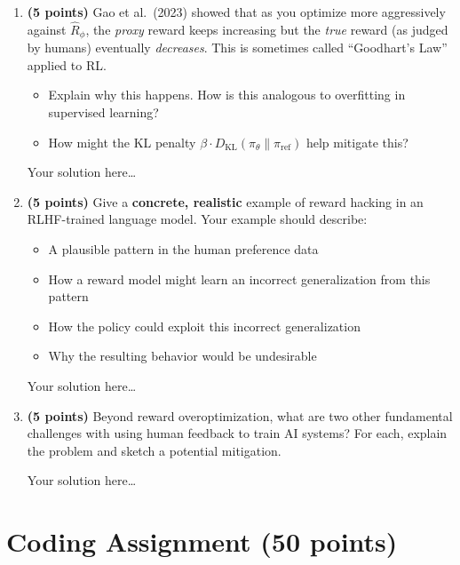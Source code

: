 \documentclass[11pt]{article}
\begin{document}
\begin{enumerate}[label=(\alph*)]
\item \textbf{(5 points)} Gao et al.\ (2023) showed that as you optimize
more aggressively against $\hat{R}_\phi$, the \emph{proxy} reward keeps
increasing but the \emph{true} reward (as judged by humans) eventually
\emph{decreases}.  This is sometimes called ``Goodhart's Law'' applied
to RL.
\begin{itemize}
  \item Explain why this happens.  How is this analogous to overfitting
        in supervised learning?
  \item How might the KL penalty $\beta \cdot D_{\text{KL}}(\pi_\theta \|
        \pi_{\text{ref}})$ help mitigate this?
\end{itemize}

\begin{solution}
Your solution here\ldots
\end{solution}

\item \textbf{(5 points)} Give a \textbf{concrete, realistic} example of
reward hacking in an RLHF-trained language model.  Your example should
describe:
\begin{itemize}
  \item A plausible pattern in the human preference data
  \item How a reward model might learn an incorrect generalization from
        this pattern
  \item How the policy could exploit this incorrect generalization
  \item Why the resulting behavior would be undesirable
\end{itemize}

\begin{solution}
Your solution here\ldots
\end{solution}

\item \textbf{(5 points)} Beyond reward overoptimization, what are two
other fundamental challenges with using human feedback to train AI systems?
For each, explain the problem and sketch a potential mitigation.

\begin{solution}
Your solution here\ldots
\end{solution}
\end{enumerate}


\section*{Coding Assignment (50 points)}
\end{document}
